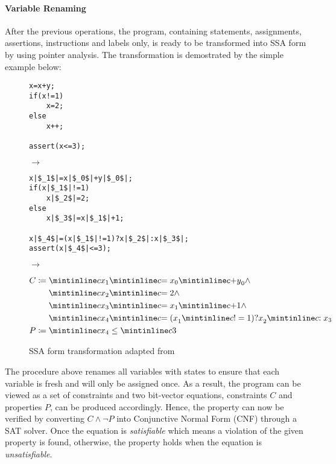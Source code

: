 \paragraph{Variable Renaming}
After the previous operations, the program, containing  statements, assignments, assertions,  instructions and labels only, is ready to be transformed into SSA form by using pointer analysis. The transformation is demostrated by the simple example below:

\begin{figure}[H]
\centering
{
\begin{minipage}{.2\textwidth}
\begin{verbatim}
x=x+y;
if(x!=1)
    x=2;
else
    x++;

assert(x<=3);
\end{verbatim}
\end{minipage}
\begin{minipage}[]{.05\textwidth}
$\to$
\end{minipage}
\begin{minipage}[]{.2\textwidth}
\begin{verbatim}
x|$_1$|=x|$_0$|+y|$_0$|;
if(x|$_1$|!=1)
    x|$_2$|=2;
else
    x|$_3$|=x|$_1$|+1;
    
x|$_4$|=(x|$_1$|!=1)?x|$_2$|:x|$_3$|;
assert(x|$_4$|<=3);
\end{verbatim}
\end{minipage}
\begin{minipage}[]{.05\textwidth}
$\to$
\end{minipage}
\begin{minipage}[]{.35\textwidth}
\begin{align*}
    C \coloneqq{}& \code{x}_1\code{=x}_0\code{+y}_0 \land \\
    &  \code{x}_2\code{=2} \land \\
    &  \code{x}_3\code{=x}_1\code{+1} \land \\
    &  \code{x}_4\code{=(x}_1\code{!=1)?x}_2\code{:x}_3 \\
    P \coloneqq{}& \code{x}_4\leq\code{3} \\
\end{align*}
\end{minipage}
}
\caption[The LOF caption]{SSA form transformation adapted from \cite{ckl2004, Clarke:2003:HVU:1119772.1119831}}
\end{figure}

The procedure above renames all variables with states to ensure that each variable is fresh and will only be assigned once. As a result, the program can be viewed as a set of constraints and two bit-vector equations, constraints $C$ and properties $P$, can be produced accordingly. Hence, the property can now be verified by converting $C \land \neg P$ into Conjunctive Normal Form (CNF) through a SAT solver. Once the equation is \textit{satisfiable} which means a violation of the given property is found, otherwise, the property holds when the equation is \textit{unsatisfiable}. 


